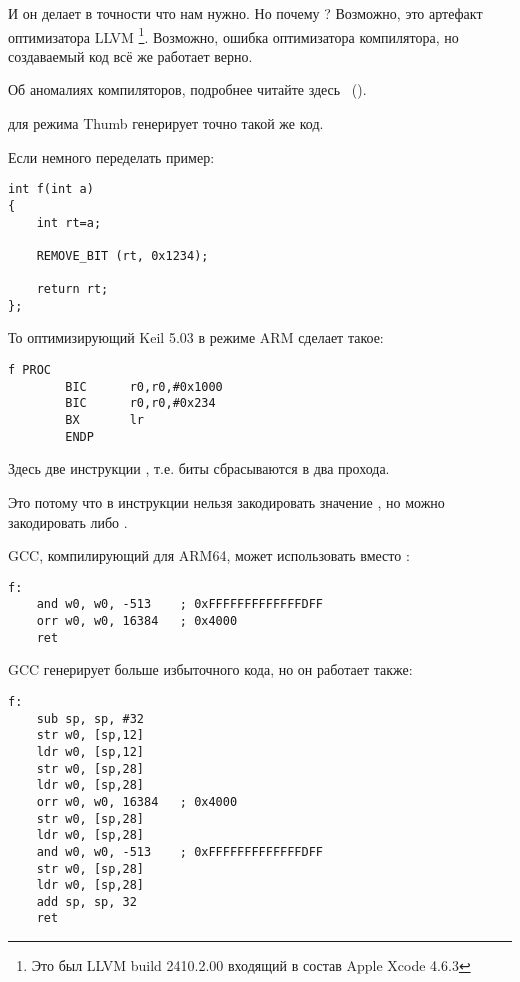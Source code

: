 И он делает в точности что нам нужно. 
Но почему ? 
Возможно, это артефакт оптимизатора LLVM
\footnote{Это был LLVM build 2410.2.00 входящий в состав Apple Xcode 4.6.3}.
Возможно, ошибка оптимизатора компилятора, но создаваемый код всё же работает верно.

Об аномалиях компиляторов, подробнее читайте здесь ~().

\OptimizingXcodeIV для режима Thumb генерирует точно такой же код.


Если немного переделать пример:

\begin{lstlisting}
int f(int a)
{
    int rt=a;

    REMOVE_BIT (rt, 0x1234);

    return rt;
};
\end{lstlisting}

То оптимизирующий Keil 5.03 в режиме ARM сделает такое:

\begin{lstlisting}
f PROC
        BIC      r0,r0,#0x1000
        BIC      r0,r0,#0x234
        BX       lr
        ENDP
\end{lstlisting}

Здесь две инструкции , т.е. биты  сбрасываются в два прохода.

Это потому что в инструкции  нельзя закодировать значение , 
но можно закодировать  либо .


\Optimizing GCC, компилирующий для ARM64, может использовать \AND вместо :

\begin{lstlisting}[caption=\Optimizing GCC (Linaro) 4.9]
f:
	and	w0, w0, -513	; 0xFFFFFFFFFFFFFDFF
	orr	w0, w0, 16384	; 0x4000
	ret
\end{lstlisting}


\NonOptimizing GCC генерирует больше избыточного кода, но он работает также:

\begin{lstlisting}[caption=\NonOptimizing GCC (Linaro) 4.9]
f:
	sub	sp, sp, #32
	str	w0, [sp,12]
	ldr	w0, [sp,12]
	str	w0, [sp,28]
	ldr	w0, [sp,28]
	orr	w0, w0, 16384	; 0x4000
	str	w0, [sp,28]
	ldr	w0, [sp,28]
	and	w0, w0, -513	; 0xFFFFFFFFFFFFFDFF
	str	w0, [sp,28]
	ldr	w0, [sp,28]
	add	sp, sp, 32
	ret
\end{lstlisting}

